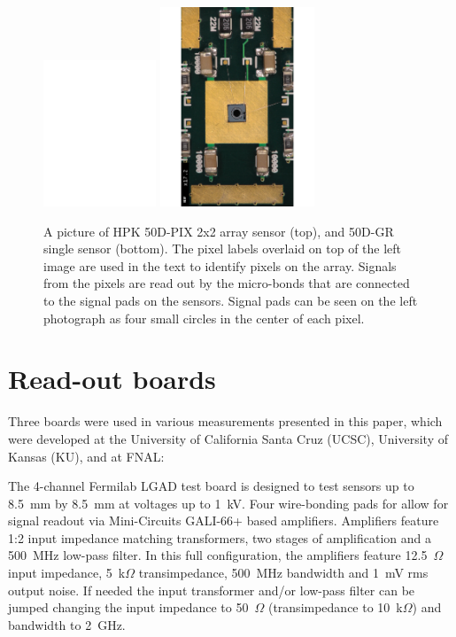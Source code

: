 \documentclass[preprint,1p]{elsarticle}
\begin{document}
\begin{figure}[!htbp] 
\centering
\includegraphics[width=0.3\textwidth]{figs/HPK-50DPix.pdf} 
\includegraphics[width=0.41\textwidth]{figs/HPK-50D.pdf} 
\caption{A picture of HPK 50D-PIX 2x2 array sensor (top), and 50D-GR single sensor (bottom). The pixel labels overlaid on top of the left image are used in the text to identify pixels on the array. Signals from the pixels are read out by the micro-bonds that are connected to the signal pads on the sensors. Signal pads can be seen on the left photograph as four small circles in the center of each pixel. } 
\label{fig:HPK_Sensors} 
\end{figure} 


\section{Read-out boards}
\label{sec:boards}

Three boards were used in various measurements presented in this paper, which
were developed at the University of California Santa Cruz (UCSC), University of
Kansas (KU), and at FNAL:

The 4-channel Fermilab LGAD test board is designed to test sensors up to 8.5~mm
by 8.5~mm at voltages up to 1~kV. Four wire-bonding pads for allow for signal
readout via Mini-Circuits GALI-66+ based amplifiers. Amplifiers feature 1:2
input impedance matching transformers, two stages of amplification and a 500~MHz
low-pass filter. In this full configuration, the amplifiers feature
12.5~$\Omega$ input impedance, 5~k$\Omega$ transimpedance, 500~MHz bandwidth and
1~mV rms output noise. If needed the input transformer and/or low-pass filter
can be jumped changing the input impedance to 50~$\Omega$ (transimpedance to
10~k$\Omega$) and bandwidth to 2~GHz.
\end{document}
